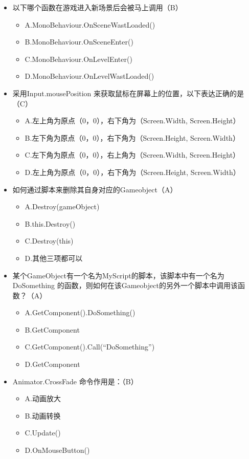 \documentclass[9pt, b5paper]{article}
\begin{document}
\begin{itemize}
\begin{itemize}
\end{itemize}
\item 以下哪个函数在游戏进入新场景后会被马上调用（B）
\begin{itemize}
\item A.MonoBehaviour.OnSceneWastLoaded()
\item B.MonoBehaviour.OnSceneEnter()
\item C.MonoBehaviour.OnLevelEnter()
\item D.MonoBehaviour.OnLevelWastLoaded()
\end{itemize}
\item 采用Input.mousePosition 来获取鼠标在屏幕上的位置，以下表达正确的是（C）
\begin{itemize}
\item A.左上角为原点（0，0），右下角为（Screen.Width, Screen.Height）
\item B.左下角为原点（0，0），右下角为（Screen.Height, Screen.Width）
\item C.左下角为原点（0，0），右上角为（Screen.Width, Screen.Height）
\item D.左上角为原点（0，0），右下角为（Screen.Height, Screen.Width）
\end{itemize}
\item 如何通过脚本来删除其自身对应的Gameobject（A）
\begin{itemize}
\item A.Destroy(gameObject)
\item B.this.Destroy()
\item C.Destroy(this)
\item D.其他三项都可以
\end{itemize}
\item 某个GameObject有一个名为MyScript的脚本，该脚本中有一个名为DoSomething 的函数，则如何在该Gameobject的另外一个脚本中调用该函数？（A）
\begin{itemize}
\item A.GetComponent().DoSomething()
\item B.GetComponent
\item C.GetComponent().Call(“DoSomething”)
\item D.GetComponent
\end{itemize}
\item Animator.CrossFade 命令作用是：（B）
\begin{itemize}
\item A.动画放大
\item B.动画转换
\item C.Update()
\item D.OnMouseButton()

\end{itemize}
\end{itemize}
\end{document}

